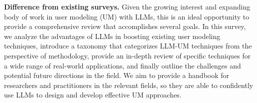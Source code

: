 \documentclass[11pt]{article}
\renewcommand\paragraph[1]{\vspace{0.05in} \noindent \textbf{#1.}}
\begin{document}


\paragraph{Difference from existing surveys}
Given the growing interest and expanding body of work in user modeling (UM) with LLMs, this is an ideal opportunity to provide a comprehensive review that accomplishes several goals. In this survey, we analyze the advantages of LLMs in boosting existing user modeling techniques, introduce a taxonomy that categorizes LLM-UM techniques from the perspective of methodology, provide an in-depth review of specific techniques for a wide range of real-world applications, and finally outline the challenges and potential future directions in the field. We aim to provide a handbook for researchers and practitioners in the relevant fields, so they are able to confidently use LLMs to design and develop effective UM approaches.
\end{document}
